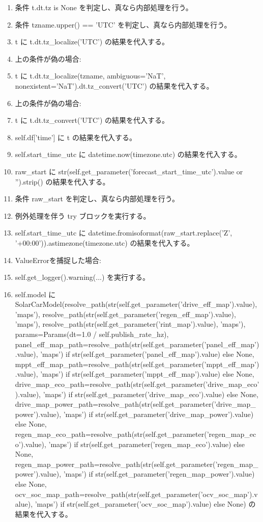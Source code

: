 \documentclass[a4paper,11pt]{article}
\begin{document}
\begin{enumerate}[leftmargin=1.8em]
\item   条件 t.dt.tz is None を判定し、真なら内部処理を行う。
\item     条件 tzname.upper() == 'UTC' を判定し、真なら内部処理を行う。
\item       t に t.dt.tz\_localize('UTC') の結果を代入する。
\item       上の条件が偽の場合:
\item       t に t.dt.tz\_localize(tzname, ambiguous='NaT', nonexistent='NaT').dt.tz\_convert('UTC') の結果を代入する。
\item     上の条件が偽の場合:
\item     t に t.dt.tz\_convert('UTC') の結果を代入する。
\item   self.df['time'] に t の結果を代入する。
\item self.start\_time\_utc に datetime.now(timezone.utc) の結果を代入する。
\item raw\_start に str(self.get\_parameter('forecast\_start\_time\_utc').value or '').strip() の結果を代入する。
\item 条件 raw\_start を判定し、真なら内部処理を行う。
\item   例外処理を伴う try ブロックを実行する。
\item     self.start\_time\_utc に datetime.fromisoformat(raw\_start.replace('Z', '+00:00')).astimezone(timezone.utc) の結果を代入する。
\item     ValueErrorを捕捉した場合:
\item     self.get\_logger().warning(...) を実行する。
\item self.model に SolarCarModel(resolve\_path(str(self.get\_parameter('drive\_eff\_map').value), 'maps'), resolve\_path(str(self.get\_parameter('regen\_eff\_map').value), 'maps'), resolve\_path(str(self.get\_parameter('rint\_map').value), 'maps'), params=Params(dt=1.0 / self.publish\_rate\_hz), panel\_eff\_map\_path=resolve\_path(str(self.get\_parameter('panel\_eff\_map').value), 'maps') if str(self.get\_parameter('panel\_eff\_map').value) else None, mppt\_eff\_map\_path=resolve\_path(str(self.get\_parameter('mppt\_eff\_map').value), 'maps') if str(self.get\_parameter('mppt\_eff\_map').value) else None, drive\_map\_eco\_path=resolve\_path(str(self.get\_parameter('drive\_map\_eco').value), 'maps') if str(self.get\_parameter('drive\_map\_eco').value) else None, drive\_map\_power\_path=resolve\_path(str(self.get\_parameter('drive\_map\_power').value), 'maps') if str(self.get\_parameter('drive\_map\_power').value) else None, regen\_map\_eco\_path=resolve\_path(str(self.get\_parameter('regen\_map\_eco').value), 'maps') if str(self.get\_parameter('regen\_map\_eco').value) else None, regen\_map\_power\_path=resolve\_path(str(self.get\_parameter('regen\_map\_power').value), 'maps') if str(self.get\_parameter('regen\_map\_power').value) else None, ocv\_soc\_map\_path=resolve\_path(str(self.get\_parameter('ocv\_soc\_map').value), 'maps') if str(self.get\_parameter('ocv\_soc\_map').value) else None) の結果を代入する。

\end{enumerate}
\end{document}

